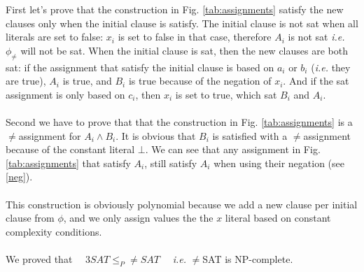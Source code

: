 \documentclass[letterpaper]{article}
\begin{document}
First let's prove that the construction in Fig. \ref{tab:assignments}
satisfy the new clauses only
when the initial clause is satisfy. The initial clause is not sat when
all literals are set to false: $x_i$ is set to false in that case,
therefore $A_{i}$ is not sat \textit{i.e.} $\phi_{\not=}$
will not be sat. When the initial clause is sat, then the
new clauses are both sat: if the assignment that satisfy the initial clause
is based on $a_i$ or $b_i$ (\textit{i.e.} they are true), $A_i$ is true,
and $B_i$ is true because of the negation of $x_i$. And if the sat assignment
is only based on $c_i$, then $x_i$ is set to true, which sat $B_i$ and $A_i$.

\paragraph{}

Second we have to prove that that the construction in Fig. \ref{tab:assignments}
is a $\not=$assignment for $A_i \wedge B_i$.
It is obvious that $B_i$ is satisfied with a $\not=$assignment because of
the constant literal $\bot$.
We can see that any
assignment in Fig. \ref{tab:assignments} that satisfy $A_i$,
still satisfy $A_i$
when using their negation (see \ref{neg}).

\paragraph{}

This construction is obviously polynomial because we add a new clause per
initial clause from $\phi$, and we only assign values the the $x$ literal
based on constant complexity conditions.

\paragraph{}

We proved that $\quad 3SAT \le_{P} \not=SAT \quad$
\textit{i.e.} $\not=$SAT is NP-complete.
\end{document}
